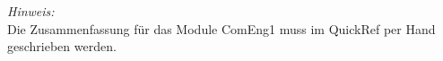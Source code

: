 \textit{Hinweis:}\\
Die Zusammenfassung für das Module ComEng1 muss im QuickRef per Hand geschrieben werden.